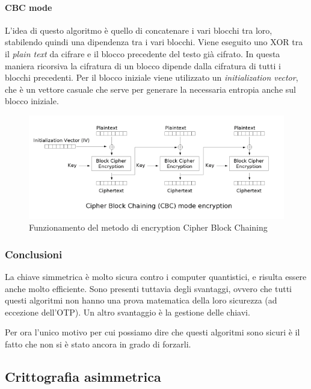 \paragraph{CBC mode}

L'idea di questo algoritmo è quello di concatenare i vari blocchi tra loro, 
stabilendo quindi una dipendenza tra i vari blocchi. Viene eseguito uno XOR tra 
il \textit{plain text} da cifrare e il blocco precedente del testo già cifrato. 
In questa maniera ricorsiva la cifratura di un blocco dipende dalla cifratura di 
tutti i blocchi precedenti. Per il blocco iniziale viene utilizzato un 
\textit{initialization vector}, che è un vettore casuale che serve per generare 
la necessaria entropia anche sul blocco iniziale.

\begin{figure}[H]
\centering
\includegraphics[scale=0.65]{res/img/cbc.png}
\caption{Funzionamento del metodo di encryption Cipher Block Chaining}
\label{fig:password:cbc}
\end{figure}

\subsubsection{Conclusioni}

La chiave simmetrica è molto sicura contro i computer quantistici, e risulta 
essere anche molto efficiente. Sono presenti tuttavia degli svantaggi, ovvero 
che tutti questi algoritmi non hanno una prova matematica della loro 
sicurezza (ad eccezione dell'OTP). Un altro svantaggio è la gestione delle 
chiavi.

Per ora l'unico motivo per cui possiamo dire che questi algoritmi sono sicuri è 
il fatto che non si è stato ancora in grado di forzarli.

\subsection{Crittografia asimmetrica}


